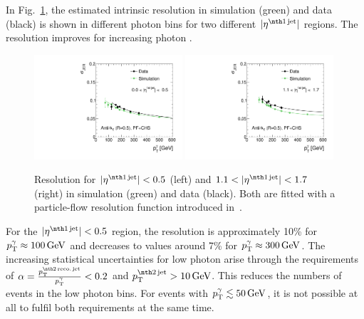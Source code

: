 In Fig.~\ref{fig:ResolutionOfPtgamma}, the estimated intrinsic resolution in simulation (green) and data (black) is shown in different photon \pt bins for two different $|\etafirstjet|$ regions.
The resolution improves for increasing photon \pt. 
\begin{figure}[!b]
  \centering
    \includegraphics[width=0.49\textwidth]{figures/resolution/methodology/Resolution_for_1_eta_bin_PFCHS_mc_RMS99.pdf}
    \includegraphics[width=0.49\textwidth]{figures/resolution/methodology/Resolution_for_3_eta_bin_PFCHS_mc_RMS99.pdf}
  \caption{Resolution for $|\etafirstjet| < 0.5$ (left) and $1.1<|\etafirstjet| < 1.7$ (right) in simulation (green) and data (black). Both are fitted with a particle-flow resolution function introduced in~\cite{bib:CMS:JERCPaper_2011}.}  
  \label{fig:ResolutionOfPtgamma}
\end{figure}
For the $|\etafirstjet|<0.5$ region, the resolution is approximately 10\% for $p_{\text{T}}^{\gamma} \approx 100\,\text{Ge}\kern-0.06667em\text{V}$ and decreases to values around 7\% for $p_{\text{T}}^{\gamma} \approx 300\,\text{Ge}\kern-0.06667em\text{V}$.
The increasing statistical uncertainties for low photon \pt arise through the requirements of $\alpha=\frac{\ptsecondrecojet}{\ptgamma}<0.2$ and $\ptsecondjet>10\gev$. 
This reduces the numbers of events in the low photon \pt bins. 
For events with ${p}_\mathrm{T}^{\gamma} \lesssim 50\,\text{Ge}\kern-0.06667em\text{V}$, it is not possible at all to fulfil both requirements at the same time.


